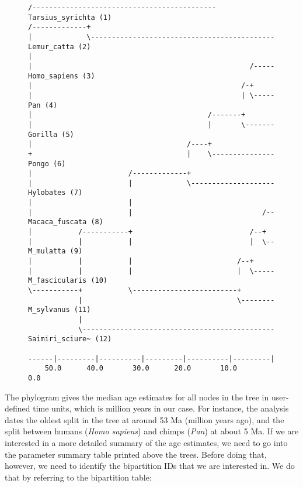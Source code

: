 \documentclass[12pt]{book}
\begin{document}
\begin{figure}[H]
\centering
\begin{BVerbatim}[fontsize=\scriptsize]
              /-------------------------------------------- Tarsius_syrichta (1)
/-------------+
|             \-------------------------------------------- Lemur_catta (2)
|
|                                                    /----- Homo_sapiens (3)
|                                                  /-+
|                                                  | \----- Pan (4)
|                                          /-------+
|                                          |       \------- Gorilla (5)
|                                     /----+
+                                     |    \--------------- Pongo (6)
|                       /-------------+
|                       |             \-------------------- Hylobates (7)
|                       |
|                       |                               /-- Macaca_fuscata (8)
|           /-----------+                            /--+
|           |           |                            |  \-- M_mulatta (9)
|           |           |                         /--+
|           |           |                         |  \----- M_fascicularis (10)
\-----------+           \-------------------------+
            |                                     \-------- M_sylvanus (11)
            |
            \---------------------------------------------- Saimiri_sciure~ (12)

------|---------|----------|---------|----------|---------|
    50.0      40.0       30.0      20.0       10.0       0.0
\end{BVerbatim}
\end{figure}

The phylogram gives the median age estimates for all nodes in the tree in user-defined time units,
which is million years in our case. For instance, the analysis dates the oldest split in the tree
at around 53 Ma (million years ago), and the split between humans (\textit{Homo sapiens}) and
chimps (\textit{Pan}) at about 5 Ma. If we are interested in a more detailed summary of the age
estimates, we need to go into the parameter summary table printed above the trees. Before doing
that, however, we need to identify the bipartition IDs that we are interested in. We do that by
referring to the bipartition table:
\end{document}
